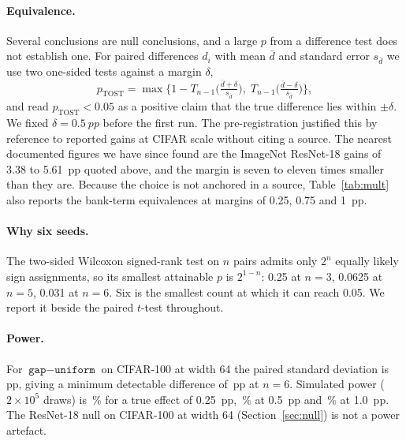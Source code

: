 \documentclass[10pt,a4paper]{article}
\begin{document}
\paragraph{Equivalence.} Several conclusions are null conclusions, and a
large $p$ from a difference test does not establish one. For paired
differences $d_i$ with mean $\bar d$ and standard error $s_{\bar d}$ we
use two one-sided tests against a margin $\delta$,
\begin{equation}
p_{\text{TOST}}=\max\Big\{1-T_{n-1}\!\Big(\tfrac{\bar d+\delta}{s_{\bar d}}\Big),\;
T_{n-1}\!\Big(\tfrac{\bar d-\delta}{s_{\bar d}}\Big)\Big\},
\end{equation}
and read $p_{\text{TOST}}<0.05$ as a positive claim that the true
difference lies within $\pm\delta$. We fixed $\delta=\SI{0.5}{pp}$ before
the first run. The pre-registration justified this by reference to
reported gains at CIFAR scale without citing a source. The nearest
documented figures we have since found are the ImageNet ResNet-18 gains
of 3.38 to \SI{5.61}{pp} quoted above, and the margin is seven to
eleven times smaller than they are. Because the choice is not anchored in
a source, Table~\ref{tab:mult} also reports the bank-term equivalences at
margins of 0.25, 0.75 and \SI{1}{pp}.

\paragraph{Why six seeds.} The two-sided Wilcoxon signed-rank test
\citep{wilcoxon1945} on $n$ pairs admits only $2^n$ equally likely sign
assignments, so its smallest attainable $p$ is $2^{1-n}$: 0.25 at $n=3$,
0.0625 at $n=5$, 0.031 at $n=6$. Six is the smallest count at which it
can reach 0.05. We report it beside the paired $t$-test throughout.

\paragraph{Power.} For $\texttt{gap}-\texttt{uniform}$ on CIFAR-100 at
width 64 the paired standard deviation is \,pp, giving a
minimum detectable difference of \,pp at $n=6$. Simulated
power ($2\times10^5$ draws) is \,\% for a true effect of
\SI{0.25}{pp}, \,\% at \SI{0.5}{pp} and
\,\% at \SI{1.0}{pp}. The ResNet-18 null on CIFAR-100 at width 64
(Section~\ref{sec:null}) is not a power artefact.
\end{document}
